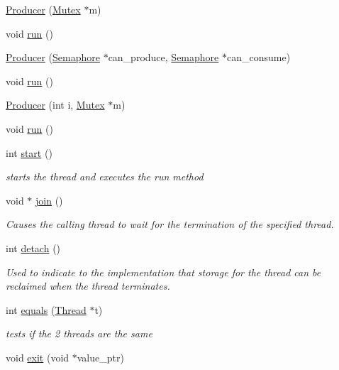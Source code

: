 \begin{DoxyCompactItemize}
\item 
\hyperlink{class_producer_ad9a471f3b6c17d1076d44ba54d7cea61}{\-Producer} (\hyperlink{class_mutex}{\-Mutex} $\ast$m)
\item 
void \hyperlink{class_producer_a8394daacf1d547b80a28c2116a7b5faf}{run} ()
\item 
\hyperlink{class_producer_a78a85dfe4230cf0be07411c3d18003d9}{\-Producer} (\hyperlink{class_semaphore}{\-Semaphore} $\ast$can\-\_\-produce, \hyperlink{class_semaphore}{\-Semaphore} $\ast$can\-\_\-consume)
\item 
void \hyperlink{class_producer_a8394daacf1d547b80a28c2116a7b5faf}{run} ()
\item 
\hyperlink{class_producer_a255de4cb71fc4aed9e853e81f881c5ff}{\-Producer} (int i, \hyperlink{class_mutex}{\-Mutex} $\ast$m)
\item 
void \hyperlink{class_producer_a8394daacf1d547b80a28c2116a7b5faf}{run} ()
\item 
int \hyperlink{class_thread_a7d563f3201d081af8cc24ea552c6a4e4}{start} ()
\begin{DoxyCompactList}\small\item\em starts the thread and executes the run method \end{DoxyCompactList}\item 
void $\ast$ \hyperlink{class_thread_a9fc97f64df2c041f08f01e8ade638046}{join} ()
\begin{DoxyCompactList}\small\item\em \-Causes the calling thread to wait for the termination of the specified thread. \end{DoxyCompactList}\item 
int \hyperlink{class_thread_a2a08036a4598cfc554114fee9d0e8485}{detach} ()
\begin{DoxyCompactList}\small\item\em \-Used to indicate to the implementation that storage for the thread can be reclaimed when the thread terminates. \end{DoxyCompactList}\item 
int \hyperlink{class_thread_af10ab7827d62665de0ebc5afbfcf1109}{equals} (\hyperlink{class_thread}{\-Thread} $\ast$t)
\begin{DoxyCompactList}\small\item\em tests if the 2 threads are the same \end{DoxyCompactList}\item 
void \hyperlink{class_thread_a64bc90df36e89fc85705cb6c35c9a81a}{exit} (void $\ast$value\-\_\-ptr)

\end{DoxyCompactItemize}

